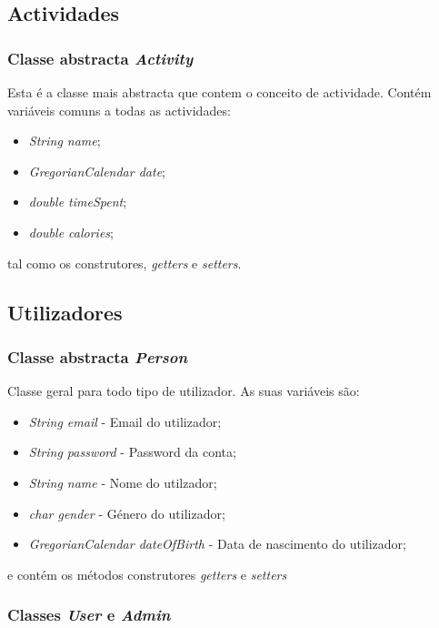 \documentclass[10pt,notitlepage]{article}
\begin{document}
\subsection{Actividades}
\subsubsection{Classe abstracta \textit{Activity}}

Esta é a classe mais abstracta que contem o conceito de actividade. Contém variáveis comuns a todas as actividades:
\begin{itemize}
\item \textit{String name};
\item \textit{GregorianCalendar date};
\item \textit{double timeSpent};
\item \textit{double calories};
\end{itemize}
tal como os construtores, \textit{getters} e \textit{setters}.



\subsection{Utilizadores}
\subsubsection{Classe abstracta \textit{Person}}
Classe geral para todo tipo de utilizador. As suas variáveis são:
\begin{itemize}
\item \textit{String email} - Email do utilizador;
\item \textit{String password} - Password da conta;
\item \textit{String name} - Nome do utilzador;
\item \textit{char gender} - Género do utilizador;
\item \textit{GregorianCalendar dateOfBirth} - Data de nascimento do utilizador;
\end{itemize}
e contém os métodos construtores \textit{getters} e \textit{setters}

\subsubsection{Classes \textit{User} e \textit{Admin}}
\end{document}
